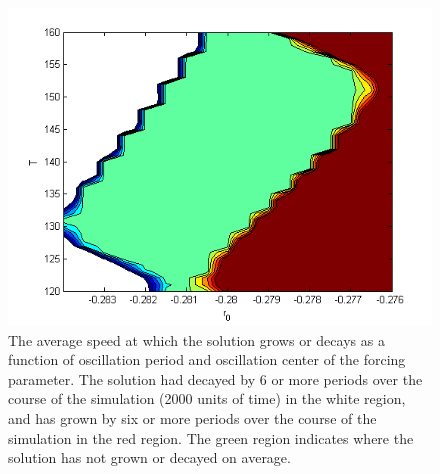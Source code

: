 \documentclass[pre,preprint,superscriptaddress]{revtex4-1}
\begin{document}
\begin{figure}[!htb]\center
\includegraphics[width=120mm]{Vcm01zoom.png}
\caption{The average speed at which the solution grows or decays as a function of oscillation period and oscillation center of the forcing parameter.  The solution had decayed by 6 or more periods over the course of the simulation (2000 units of time) in the white region, and has grown by six or more periods over the course of the simulation  in the red region.  The green region indicates where the solution has not grown or decayed on average.}
    \label{fig:Vcm01zoom}
\end{figure}
\end{document}
